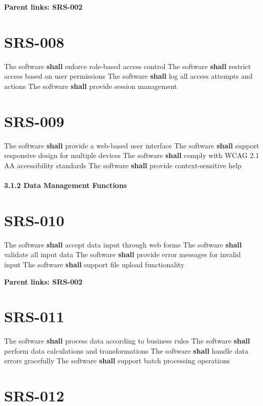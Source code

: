 \textbf{Parent links: SRS-002}

\section{SRS-008}\label{SRS-008}

The software \textbf{shall} enforce role-based access control
The software \textbf{shall} restrict access based on user permissions
The software \textbf{shall} log all access attempts and actions
The software \textbf{shall} provide session management

\section{SRS-009}\label{SRS-009}

The software \textbf{shall} provide a web-based user interface
The software \textbf{shall} support responsive design for multiple devices
The software \textbf{shall} comply with WCAG 2.1 AA accessibility standards
The software \textbf{shall} provide context-sensitive help

\paragraph{3.1.2 Data Management Functions}

\section{SRS-010}\label{SRS-010}

The software \textbf{shall} accept data input through web forms
The software \textbf{shall} validate all input data
The software \textbf{shall} provide error messages for invalid input
The software \textbf{shall} support file upload functionality

\textbf{Parent links: SRS-002}

\section{SRS-011}\label{SRS-011}

The software \textbf{shall} process data according to business rules
The software \textbf{shall} perform data calculations and transformations
The software \textbf{shall} handle data errors gracefully
The software \textbf{shall} support batch processing operations

\section{SRS-012}\label{SRS-012}

